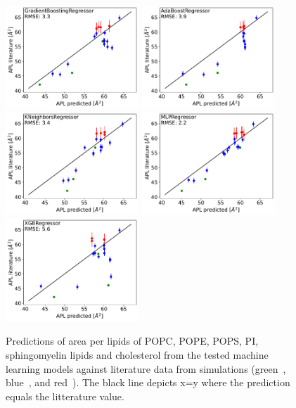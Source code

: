 \documentclass[fleqn,10pt]{wlscirepSI}
\begin{document}
\begin{figure}[hb]
    \includegraphics[width=50mm]{Figures/MLtest/GradientBoostingRegressortest.pdf}
    \includegraphics[width=50mm]{Figures/MLtest/AdaBoostRegressortest.pdf}
    \includegraphics[width=50mm]{Figures/MLtest/KNeighborsRegressortest.pdf}
    \includegraphics[width=50mm]{Figures/MLtest/MLPRegressortest.pdf}
    \includegraphics[width=50mm]{Figures/MLtest/XGBRegressortest.pdf}
    \caption{Predictions of area per lipids of POPC, POPE, POPS, PI, sphingomyelin lipids and cholesterol from the tested machine learning models against literature data from simulations
      (green~\cite{shahane19}, blue~\cite{kumar21}, and red~\cite{oliveira22}). The black line depicts x=y where the prediction equals the litterature value.}
    \label{fig:MLTest}
\end{figure}
\end{document}
